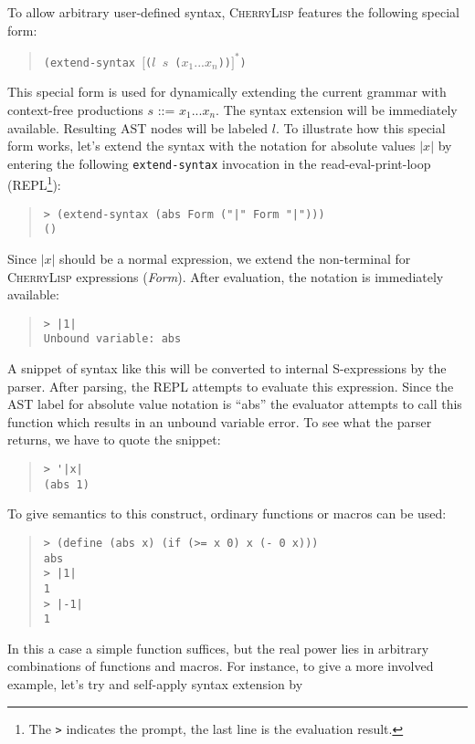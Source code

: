 \documentclass[a4paper]{llncs}
\def\cherrylisp{\textsc{CherryLisp}\xspace}
\begin{document}
To allow arbitrary user-defined syntax, \cherrylisp features the
following special form:
\begin{quote}
\texttt{(extend-syntax $[$($l$ $s$ ($x_1 ... x_n$))$]^{*}$)} 
\end{quote}
This special form is used for dynamically extending the current
grammar with context-free productions $s$ ::= $x_1 ... x_n$. The
syntax extension will be immediately available. Resulting AST nodes
will be labeled $l$.  To illustrate how this special form works, let's
extend the syntax with the notation for absolute values $|x|$ by
entering the following \texttt{extend-syntax} invocation in the
read-eval-print-loop (REPL\footnote{The \texttt{>} indicates the
  prompt, the last line is the evaluation result.}):
\begin{quote}
\begin{verbatim}
> (extend-syntax (abs Form ("|" Form "|")))
()
\end{verbatim}
\end{quote}
Since $|x|$ should be a normal expression, we extend the non-terminal
for \cherrylisp expressions (\textit{Form}). After evaluation,
the notation is immediately available:
\begin{quote}
\begin{verbatim}
> |1|
Unbound variable: abs
\end{verbatim}
\end{quote}
A snippet of syntax like this will be converted to internal
S-expressions by the parser. After parsing, the REPL attempts to
evaluate this expression. Since the AST label for absolute value notation is
``abs'' the evaluator attempts to call this function which results in
an unbound variable error. To see what the parser returns, we have to
quote the snippet:
\begin{quote}
\begin{verbatim}
> '|x|
(abs 1)
\end{verbatim}
\end{quote}
To give semantics to this construct, ordinary functions or macros can
be used:
\begin{quote}
\begin{verbatim}
> (define (abs x) (if (>= x 0) x (- 0 x)))
abs
> |1|
1
> |-1|
1
\end{verbatim}
\end{quote}
In this a case a simple function suffices, but the real power lies in
arbitrary combinations of functions and macros. For instance, to give
a more involved example, let's try and self-apply syntax extension by
\end{document}
